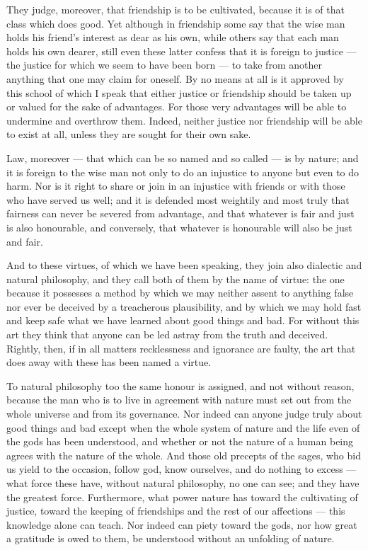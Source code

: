  They judge, moreover, that friendship is to be cultivated, because it is of that class which does good. Yet although in friendship some say that the wise man holds his friend's interest as dear as his own, while others say that each man holds his own dearer, still even these latter confess that it is foreign to justice — the justice for which we seem to have been born — to take from another anything that one may claim for oneself. By no means at all is it approved by this school of which I speak that either justice or friendship should be taken up or valued for the sake of advantages. For those very advantages will be able to undermine and overthrow them. Indeed, neither justice nor friendship will be able to exist at all, unless they are sought for their own sake.

 Law, moreover — that which can be so named and so called — is by nature; and it is foreign to the wise man not only to do an injustice to anyone but even to do harm. Nor is it right to share or join in an injustice with friends or with those who have served us well; and it is defended most weightily and most truly that fairness can never be severed from advantage, and that whatever is fair and just is also honourable, and conversely, that whatever is honourable will also be just and fair.

 And to these virtues, of which we have been speaking, they join also dialectic and natural philosophy, and they call both of them by the name of virtue: the one because it possesses a method by which we may neither assent to anything false nor ever be deceived by a treacherous plausibility, and by which we may hold fast and keep safe what we have learned about good things and bad. For without this art they think that anyone can be led astray from the truth and deceived. Rightly, then, if in all matters recklessness and ignorance are faulty, the art that does away with these has been named a virtue.

 To natural philosophy too the same honour is assigned, and not without reason, because the man who is to live in agreement with nature must set out from the whole universe and from its governance. Nor indeed can anyone judge truly about good things and bad except when the whole system of nature and the life even of the gods has been understood, and whether or not the nature of a human being agrees with the nature of the whole. And those old precepts of the sages, who bid us yield to the occasion, follow god, know ourselves, and do nothing to excess — what force these have, without natural philosophy, no one can see; and they have the greatest force. Furthermore, what power nature has toward the cultivating of justice, toward the keeping of friendships and the rest of our affections — this knowledge alone can teach. Nor indeed can piety toward the gods, nor how great a gratitude is owed to them, be understood without an unfolding of nature.


